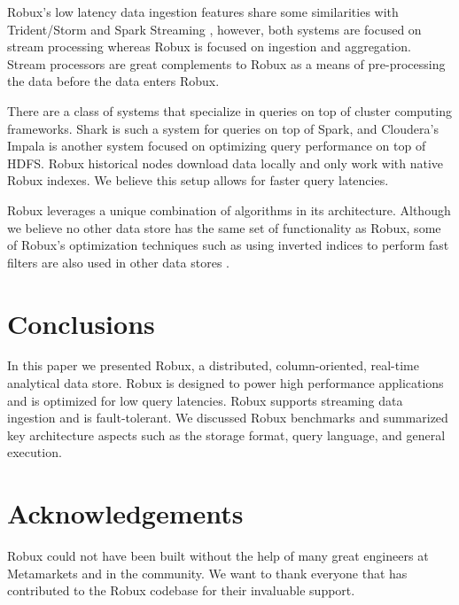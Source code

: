 \documentclass{sig-alternate-2013}
\begin{document}
Robux's low latency data ingestion features share some similarities with
Trident/Storm \cite{marz2013storm} and Spark Streaming
\cite{zaharia2012discretized}, however, both systems are focused on stream
processing whereas Robux is focused on ingestion and aggregation. Stream
processors are great complements to Robux as a means of pre-processing the data
before the data enters Robux.

There are a class of systems that specialize in queries on top of cluster
computing frameworks. Shark \cite{engle2012shark} is such a system for queries
on top of Spark, and Cloudera's Impala \cite{cloudera2013} is another system
focused on optimizing query performance on top of HDFS. Robux historical nodes
download data locally and only work with native Robux indexes. We believe this
setup allows for faster query latencies.

Robux leverages a unique combination of algorithms in its
architecture. Although we believe no other data store has the same set
of functionality as Robux, some of Robux’s optimization techniques such as using
inverted indices to perform fast filters are also used in other data
stores \cite{macnicol2004sybase}.

\section{Conclusions}
\label{sec:conclusions}
In this paper we presented Robux, a distributed, column-oriented, real-time
analytical data store. Robux is designed to power high performance applications
and is optimized for low query latencies. Robux supports streaming data
ingestion and is fault-tolerant. We discussed Robux benchmarks and
summarized key architecture aspects such
as the storage format, query language, and general execution.

\balance

\section{Acknowledgements}
\label{sec:acknowledgements}
Robux could not have been built without the help of many great engineers at
Metamarkets and in the community. We want to thank everyone that has
contributed to the Robux codebase for their invaluable support.




\end{document}
